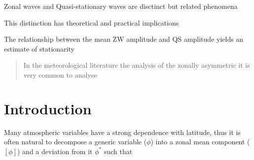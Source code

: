 \documentclass[draft,linenumbers]{agujournal2018}
\begin{document}



\begin{keypoints}
\item Zonal waves and Quasi-stationary waves are disctinct but related
phenomena
\item This distinction has theoretical and practical implications
\item The relationship between the mean ZW amplitude and QS amplitude yields
an estimate of stationarity
\end{keypoints}

%
%


\begin{abstract}
In the meteorological literature the analysis of the zonally asymmetric
it is very common to analyse
\end{abstract}

\section{Introduction}

Many atmospheric variables have a strong dependence with latitude, thus
it is often natural to decompose a generic variable (\(\phi\)) into a
zonal mean component (\([\phi]\)) and a deviation from it \(\phi^*\)
such that
\end{document}
